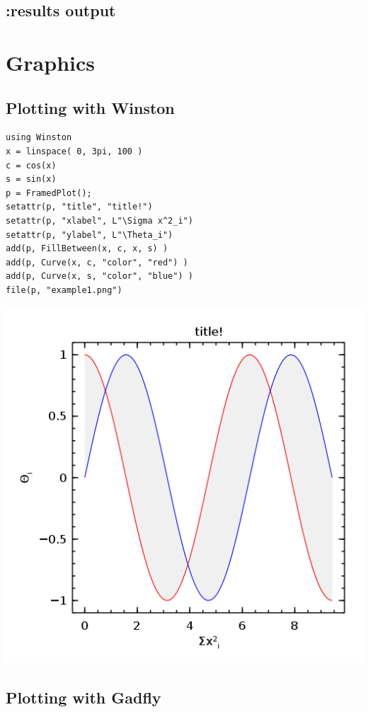 \documentclass[11pt]{article}
\begin{document}
\subsection[:results output]{:results output}
\label{sec-5-2}
\section[Graphics]{Graphics}
\label{sec-6}

\subsection[Plotting with Winston]{Plotting with Winston}
\label{sec-6-1}

\begin{verbatim}
using Winston
x = linspace( 0, 3pi, 100 )
c = cos(x)
s = sin(x)
p = FramedPlot();
setattr(p, "title", "title!")
setattr(p, "xlabel", L"\Sigma x^2_i")
setattr(p, "ylabel", L"\Theta_i")
add(p, FillBetween(x, c, x, s) )
add(p, Curve(x, c, "color", "red") )
add(p, Curve(x, s, "color", "blue") )
file(p, "example1.png")
\end{verbatim}

\includegraphics[width=.9\linewidth]{example1.png}

\subsection[Plotting with Gadfly]{Plotting with Gadfly}
\label{sec-6-2}
\end{document}
